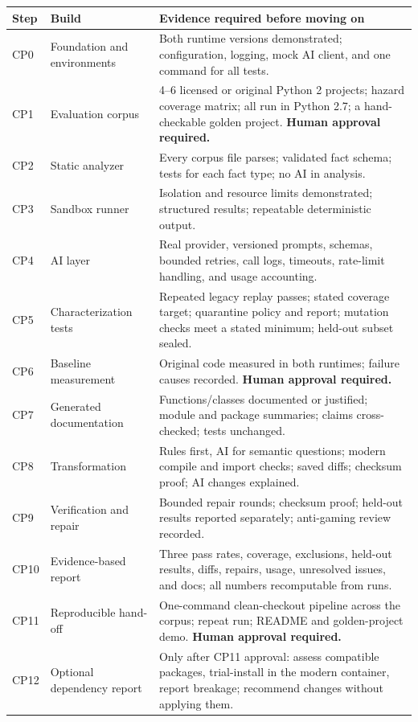 \documentclass[11pt,a4paper]{article}
\begin{document}
\small
\begin{tabularx}{\linewidth}{@{}p{1.0cm}p{3.4cm}Y@{}}
\toprule
\textbf{Step} & \textbf{Build} & \textbf{Evidence required before moving on}\\
\midrule
CP0 & Foundation and environments & Both runtime versions demonstrated; configuration,
logging, mock AI client, and one command for all tests.\\
CP1 & Evaluation corpus & 4--6 licensed or original Python 2 projects; hazard coverage
matrix; all run in Python 2.7; a hand-checkable golden project.
\textbf{Human approval required.}\\
CP2 & Static analyzer & Every corpus file parses; validated fact schema;
tests for each fact type; no AI in analysis.\\
CP3 & Sandbox runner & Isolation and resource limits demonstrated;
structured results; repeatable deterministic output.\\
CP4 & AI layer & Real provider, versioned prompts, schemas, bounded retries,
call logs, timeouts, rate-limit handling, and usage accounting.\\
CP5 & Characterization tests & Repeated legacy replay passes; stated coverage target;
quarantine policy and report; mutation checks meet a stated minimum;
held-out subset sealed.\\
CP6 & Baseline measurement & Original code measured in both runtimes; failure
causes recorded. \textbf{Human approval required.}\\
CP7 & Generated documentation & Functions/classes documented or justified;
module and package summaries; claims cross-checked; tests unchanged.\\
CP8 & Transformation & Rules first, AI for semantic questions; modern compile
and import checks; saved diffs; checksum proof; AI changes explained.\\
CP9 & Verification and repair & Bounded repair rounds; checksum proof; held-out
results reported separately; anti-gaming review recorded.\\
CP10 & Evidence-based report & Three pass rates, coverage, exclusions, held-out
results, diffs, repairs, usage, unresolved issues, and docs;
all numbers recomputable from runs.\\
CP11 & Reproducible hand-off & One-command clean-checkout pipeline across the corpus;
repeat run; README and golden-project demo.
\textbf{Human approval required.}\\
CP12 & Optional dependency report & Only after CP11 approval: assess compatible
packages, trial-install in the modern container, report breakage;
recommend changes without applying them.\\
\bottomrule
\end{tabularx}
\normalsize
\end{document}

